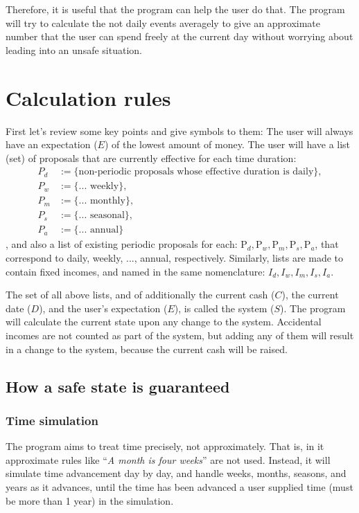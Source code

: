 Therefore, it is useful that the program can help the user do that. The program will try to calculate the not daily events averagely to give an approximate number that the user can spend freely at the current day without worrying about leading into an unsafe situation.

\section{Calculation rules} \label{sec:cal.rule}
First let's review some key points and give symbols to them: The user will always have an expectation ($E$) of the lowest amount of money. The user will have a list (set) of proposals that are currently effective for each time duration:
\begin{align*}
P_d &:= \{\text{non-periodic proposals whose effective duration is daily} \}, 
\\P_w &:= \{\text{... weekly}\}, 
\\P_m &:= \{\text{... monthly}\}, 
\\P_s &:= \{\text{... seasonal}\}, 
\\P_a &:= \{\text{... annual}\}
\end{align*},
and also a list of existing periodic proposals for each: $\mathrm{P}_d, \mathrm{P}_w, \mathrm{P}_m, \mathrm{P}_s, \mathrm{P}_a$, that correspond to daily, weekly, ..., annual, respectively. Similarly, lists are made to contain fixed incomes, and named in the same nomenclature: $I_d, I_w, I_m, I_s, I_a$.

The set of all above lists, and of additionally the current cash ($C$), the current date ($D$), and the user's expectation ($E$), is called the system ($S$). The program will calculate the current state upon any change to the system. Accidental incomes are not counted as part of the system, but adding any of them will result in a change to the system, because the current cash will be raised.

\subsection{How a safe state is guaranteed}
\subsubsection{Time simulation} \label{subsubsec:cal:state.cal:time.sim}
The program aims to treat time precisely, not approximately. That is, in it approximate rules like ``\emph{A month is four weeks}'' are not used. Instead, it will simulate time advancement day by day, and handle weeks, months, seasons, and years as it advances, until the time has been advanced a user supplied time (must be more than 1 year) in the simulation.

